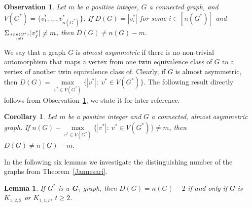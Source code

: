 \documentclass[12pt]{article}
\newtheorem{corollary}[theorem]{Corollary}
\newtheorem{lemma}[theorem]{Lemma}
\newtheorem{observation}[theorem]{Observation}
\begin{document}
\begin{observation} \label{obser}
Let $m$ be a positive integer, $G$ a connected graph, and $V(G^{\ast})=\{v^{\ast}_1, \ldots, v^{\ast}_{n(G^{\ast})}\}$. If $D(G) =|v^{\ast}_i|$  for some $i\in [n(G^{\ast})]$ and $\Sigma_{j\in n(G^{\ast})\atop j\ne i} |v^{\ast}_j| \ne m$, 
then $D(G) \neq n(G)-m$.
\end{observation}

We say that a graph $G$ is {\it almost asymmetric} if there is no non-trivial automorphism that maps a vertex from one twin equivalence class of $G$ to a vertex of another twin equivalence class of. Clearly, if $G$ is almost asymmetric, then $D(G)= \max\limits_{v^{\ast} \in V(G^{\ast})} \{|v^{\ast}|: \ v^{\ast} \in V(G^{\ast}) \}$. The following result directly follows from Observation~\ref{obser}, we state it for later reference. 

\begin{corollary}\label{lem-almost-asymmetric}
Let $m$ be a positive integer and $G$ a connected, almost asymmetric graph. If $n(G) - \max\limits_{v^{\ast} \in V(G^{\ast})} \{|v^{\ast}|:\ v^{\ast} \in V(G^{\ast}) \}  \neq m$, then $D(G) \neq n(G)-m$.
\end{corollary} 

In the following six lemmas we investigate the distinguishing number of the graphs from Theorem~\ref{Jannesari}.

\begin{lemma}\label{G1}
If $G^{\ast}$ is a {\bf G}$_1$ graph, then $D(G) =n(G)-2$ if and only if $G$ is $K_{1, 2, 2}$ or $K_{1, 1, t}$, $t\geq 2$. 
\end{lemma}
\end{document}

